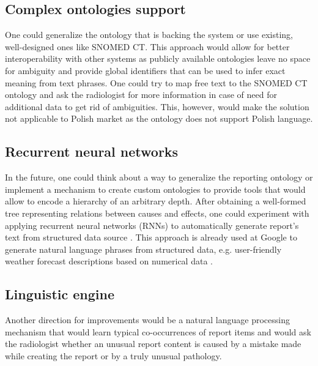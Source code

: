 \documentclass[12pt, twoside, openany]{report}
\theoremstyle{definition}
\begin{document}
\subsection{Complex ontologies support}
One could generalize the ontology that is backing the system or use existing, well-designed ones like SNOMED CT. This approach would allow for better interoperability with other systems as publicly available ontologies leave no space for ambiguity and provide global identifiers that can be used to infer exact meaning from text phrases. One could try to map free text to the SNOMED CT ontology and ask the radiologist for more information in case of need for additional data to get rid of ambiguities. This, however, would make the solution not applicable to Polish market as the ontology does not support Polish language. 

\subsection{Recurrent neural networks}
In the future, one could think about a way to generalize the reporting ontology or implement a mechanism to create custom ontologies to provide tools that would allow to encode a hierarchy of an arbitrary depth. After obtaining a well-formed tree representing relations between causes and effects, one could experiment with applying recurrent neural networks (RNNs) to automatically generate report's text from structured data source \cite{recurrent-neural-networks}. This approach is already used at Google  to generate natural language phrases from structured data, e.g. user-friendly weather forecast descriptions based on numerical data \cite{recurrent-neural-networks-google}.
\subsection{Linguistic engine}
Another direction for improvements would be a natural language processing mechanism that would learn typical co-occurrences of report items and would ask the radiologist whether an unusual report content is caused by a mistake made while creating the report or by a truly unusual pathology. 


\end{document}
